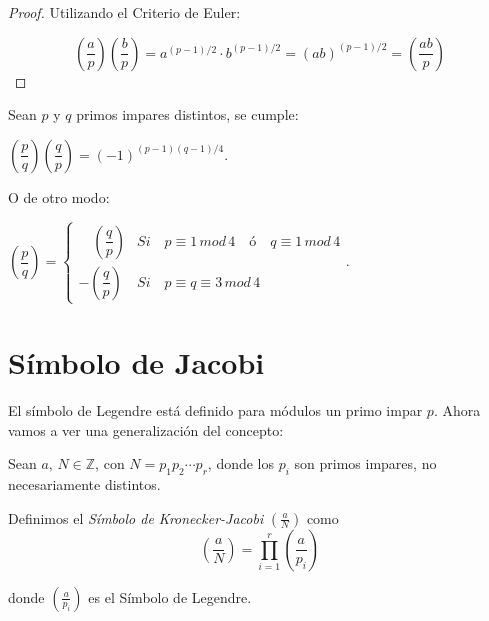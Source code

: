 \begin{proof}
	Utilizando el Criterio de Euler:
	
	\[
			\left( \dfrac{a}{p} \right) 	\left( \dfrac{b}{p} \right) =
			a^{(p-1)/2} \cdot b^{(p-1)/2} = (ab)^{(p-1)/2} =
			 	\left( \dfrac{ab}{p} \right) 
	\]
	
\end{proof}

\begin{theorem}
	Sean $p$ y $q$ primos impares distintos, se cumple:
	
	\begin{center}
		$
	\left( \dfrac{p}{q} \right) 	\left( \dfrac{q}{p} \right) = \left( -1 \right) ^{(p-1)(q-1)/4}
	$.
	\end{center}
	O de otro modo:
	
	\begin{center}
		$
		\left({\dfrac p q}\right) = \begin{cases}
		\quad \left({\dfrac q p}\right) & Si\quad p \equiv 1 \, mod \, 4 \quad  ó \quad  q \equiv 1 \, mod \, 4 \\
		-\left({\dfrac q p}\right) & Si\quad p \equiv q \equiv 3 \, mod \, 4
		\end{cases}
		$.
	\end{center}
	
	\label{quadRec:theo}
	
	
\end{theorem}



\hfil

\section{Símbolo de Jacobi}


El símbolo de Legendre está definido para módulos un primo impar $p$. Ahora vamos a ver una generalización del concepto:

\begin{definition}
	Sean $a,\,N\in \mathbb{Z}$, con $N = p_1 p_2 \cdots p_r$, donde los $p_i$ son primos impares, no necesariamente distintos.
	
	Definimos el \textit{Símbolo de Kronecker-Jacobi} $\left( \frac{a}{N} \right) $ como
		\[
		\left( \dfrac{a}{N} \right) = \prod_{i=1}^{r} \left( \dfrac{a}{p_i} \right)
		\]
		
	donde $\left( \frac{a}{p_i} \right)$ es el Símbolo de Legendre.
	 
\end{definition}

